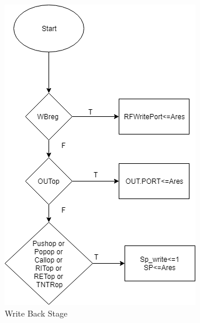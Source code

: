 \documentclass[12pt]{article}
\theoremstyle{plain}
\theoremstyle{definition}
\begin{document}
\begin{figure}
    \centering
    \includegraphics[]{Diagrams/WBStage.png}
    \caption{Write Back Stage}
    \label{WB-chart}
\end{figure}
\end{document}
